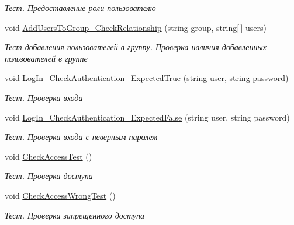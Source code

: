 \begin{DoxyCompactItemize}
\begin{DoxyCompactList}\small\item\em Тест. Предоставление роли пользователю \end{DoxyCompactList}\item 
void \hyperlink{interface_security_1_1_interfaces_1_1_tests_1_1_i_security_work_unit_test_a8d829077d51acf2111e0065999c1ec8f}{Add\+Users\+To\+Group\+\_\+\+Check\+Relationship} (string group, string\mbox{[}$\,$\mbox{]} users)
\begin{DoxyCompactList}\small\item\em Тест добавления пользователей в группу. Проверка наличия добавленных пользователей в группе \end{DoxyCompactList}\item 
void \hyperlink{interface_security_1_1_interfaces_1_1_tests_1_1_i_security_work_unit_test_a5353dbe8f678db00b4a49d946cf517f7}{Log\+In\+\_\+\+Check\+Authentication\+\_\+\+Expected\+True} (string user, string password)
\begin{DoxyCompactList}\small\item\em Тест. Проверка входа \end{DoxyCompactList}\item 
void \hyperlink{interface_security_1_1_interfaces_1_1_tests_1_1_i_security_work_unit_test_ab9261306b37909690ca44c01231e7987}{Log\+In\+\_\+\+Check\+Authentication\+\_\+\+Expected\+False} (string user, string password)
\begin{DoxyCompactList}\small\item\em Тест. Проверка входа с неверным паролем \end{DoxyCompactList}\item 
void \hyperlink{interface_security_1_1_interfaces_1_1_tests_1_1_i_security_work_unit_test_a194b8dd16cd9598c984793f6e72c11a3}{Check\+Access\+Test} ()
\begin{DoxyCompactList}\small\item\em Тест. Проверка доступа \end{DoxyCompactList}\item 
void \hyperlink{interface_security_1_1_interfaces_1_1_tests_1_1_i_security_work_unit_test_a5dddedd2dd42cb99e6d0c47742996356}{Check\+Access\+Wrong\+Test} ()
\begin{DoxyCompactList}\small\item\em Тест. Проверка запрещенного доступа \end{DoxyCompactList}\end{DoxyCompactItemize}


